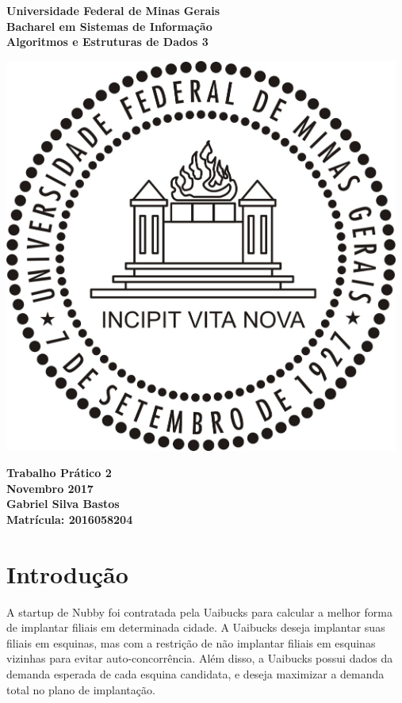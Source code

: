\documentclass{article}
\begin{document}
\begin{titlepage}
  \centering
  
  \vfill{
    \bfseries\Huge
    Universidade Federal de Minas Gerais\\[5pt]
    \bfseries\Large
    Bacharel em Sistemas de Informação \\
    Algoritmos e Estruturas de Dados 3\\
  }
  
  \vfill
  
  \includegraphics[width=13cm]{images/ufmg_logo.jpg}
  
  \vfill{
    \bfseries\Large
    Trabalho Prático 2\\
    Novembro 2017\\
  }
  \vfill{
    \bfseries\large
    Gabriel Silva Bastos\\[5pt]
    Matrícula: 2016058204
  }
\end{titlepage}


\section{Introdução}
A startup de Nubby foi contratada pela Uaibucks para calcular a melhor forma de implantar filiais em determinada cidade. A Uaibucks deseja implantar suas filiais em esquinas, mas com a restrição de não implantar filiais em esquinas vizinhas para evitar auto-concorrência. Além disso, a Uaibucks possui dados da demanda esperada de cada esquina candidata, e deseja maximizar a demanda total no plano de implantação.
\end{document}

